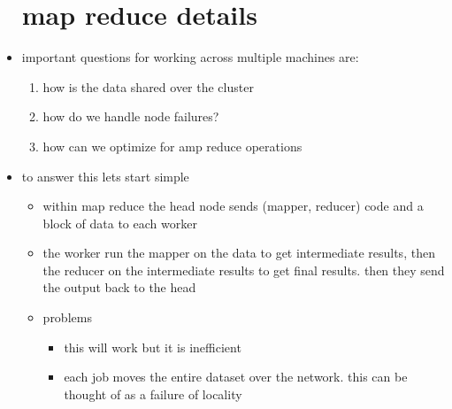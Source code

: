 \documentclass{article}
\begin{document}
\begin{itemize}
\section{map reduce details}
\item important questions for working across multiple machines are:
\begin{enumerate}
    \item how is the data shared over the cluster
    \item how do we handle node failures?
    \item how can we optimize for amp reduce operations
\end{enumerate}
\item to answer this lets start simple
\begin{itemize}
    \item within map reduce the head node sends (mapper, reducer) code and a block of data to each worker
    \item the worker run the mapper on the data to get intermediate results, then the reducer on the intermediate results to get final results. then they send the output back to the head 
    \item problems
    \begin{itemize}
        \item this will work but it is inefficient 
        \item each job moves the entire dataset over the network. this can be thought of as a failure of locality
    \end{itemize}


\end{itemize}
\end{itemize}
\end{document}
